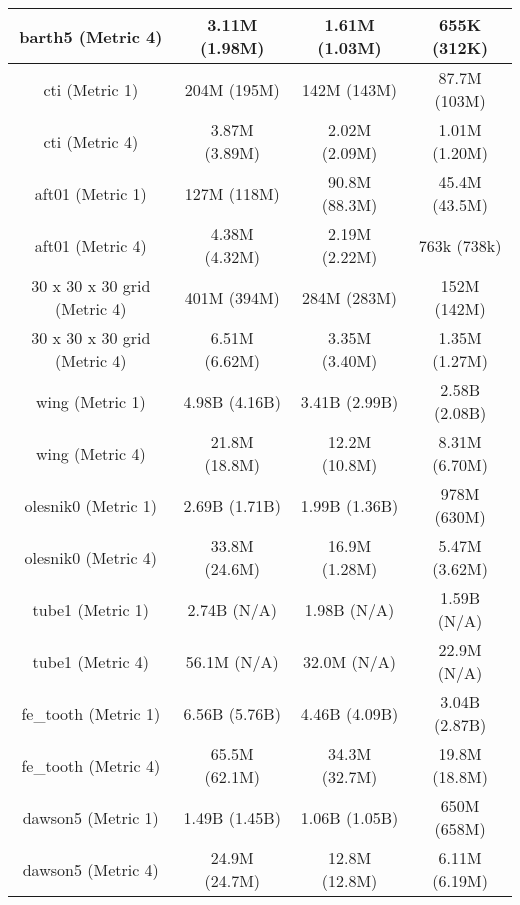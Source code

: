 \documentclass{sig-alternate}
\begin{document}
\begin{table*}[htb!]
{\begin{tabular}{|c|c|c|c|}
barth5 (Metric 4) & 3.11M (1.98M) & 1.61M (1.03M) & 655K (312K) \\\hline
cti (Metric 1) & 204M (195M) & 142M (143M) & 87.7M (103M) \\\hline
cti (Metric 4) & 3.87M (3.89M) & 2.02M (2.09M) & 1.01M (1.20M) \\\hline
aft01 (Metric 1) & 127M (118M) & 90.8M (88.3M) & 45.4M (43.5M) \\\hline
aft01 (Metric 4) & 4.38M (4.32M) & 2.19M (2.22M) & 763k (738k) \\\hline
30 x 30 x 30 grid (Metric 4) & 401M (394M) & 284M (283M) & 152M (142M) \\\hline
30 x 30 x 30 grid (Metric 4) & 6.51M (6.62M) & 3.35M (3.40M) & 1.35M (1.27M) \\\hline
wing (Metric 1) & 4.98B (4.16B) & 3.41B (2.99B) & 2.58B (2.08B) \\\hline
wing (Metric 4) & 21.8M (18.8M) & 12.2M (10.8M) & 8.31M (6.70M) \\\hline
olesnik0 (Metric 1) & 2.69B (1.71B) & 1.99B (1.36B) & 978M (630M) \\\hline
olesnik0 (Metric 4) & 33.8M (24.6M) & 16.9M (1.28M) & 5.47M (3.62M) \\\hline
tube1 (Metric 1) & 2.74B (N/A) & 1.98B (N/A) & 1.59B (N/A) \\\hline
tube1 (Metric 4) & 56.1M (N/A) & 32.0M (N/A) & 22.9M (N/A) \\\hline
fe\_tooth (Metric 1) & 6.56B (5.76B) & 4.46B (4.09B) & 3.04B (2.87B) \\\hline
fe\_tooth (Metric 4) & 65.5M (62.1M) & 34.3M (32.7M) & 19.8M (18.8M) \\\hline
dawson5 (Metric 1) & 1.49B (1.45B) & 1.06B (1.05B) & 650M (658M) \\\hline
dawson5 (Metric 4) & 24.9M (24.7M) & 12.8M (12.8M) & 6.11M (6.19M) \\\hline

\end{tabular}
}


\end{table*}
\end{document}
